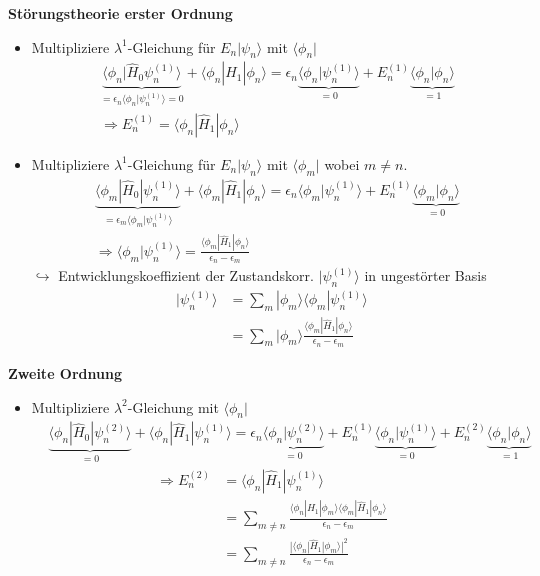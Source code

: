 \documentclass[10pt,article,colorback,accentcolor=tud9d]{scrartcl}
\begin{document}
\noindent\textbf{Störungstheorie erster Ordnung}
\begin{itemize}
	\item Multipliziere $\lambda^1$-Gleichung für $E_n|\psi_n\rangle$ mit $\langle\phi_n|$
    \begin{align}
    &\underbrace{\langle\phi_n|\hat{H}_0\psi_n^{(1)}\rangle}_{=\epsilon_n\langle\phi_n|\psi_n^{(1)}\rangle=0}+\langle\phi_n|\hat{H}_1|\phi_n\rangle=\epsilon_n\underbrace{\langle\phi_n|\psi_n^{(1)}\rangle}_{=0}+E_n^{(1)}\underbrace{\langle\phi_n|\phi_n\rangle}_{=1}\\
    &\Rightarrow E_n^{(1)}=\langle\phi_n|\hat{H}_1|\phi_n\rangle
    \end{align}
  \item Multipliziere $\lambda^1$-Gleichung für $E_n|\psi_n\rangle$ mit $\langle\phi_m|$ wobei $m\neq n$.
    \begin{align}
    &\underbrace{\langle\phi_m|\hat{H}_0|\psi_n^{(1)}\rangle}_{=\epsilon_m\langle\phi_m|\psi_n^{(1)}\rangle}+\langle\phi_m|\hat{H}_1|\phi_n\rangle=\epsilon_n\langle\phi_m|\psi_n^{(1)}\rangle+E_n^{(1)}\underbrace{\langle\phi_m|\phi_n\rangle}_{=0}\\
    &\Rightarrow \langle\phi_m|\psi_n^{(1)}\rangle=\frac{\langle\phi_m|\hat{H}_1|\phi_n\rangle}{\epsilon_n-\epsilon_m}
    \end{align}
    $\hookrightarrow$ Entwicklungskoeffizient der Zustandskorr. $|\psi_n^{(1)}\rangle$ in ungestörter Basis
    \begin{align}
    |\psi_n^{(1)}\rangle&=\sum_m|\phi_m\rangle\langle\phi_m|\psi_n^{(1)}\rangle\\
    &=\sum_m|\phi_m\rangle\frac{\langle\phi_m|\hat{H}_1|\phi_n\rangle}{\epsilon_n-\epsilon_m}
    \end{align}
\end{itemize}

\noindent\textbf{Zweite Ordnung}
\begin{itemize}
	\item Multipliziere $\lambda^2$-Gleichung mit $\langle\phi_n|$ 
    \begin{align}
    &\underbrace{\langle\phi_n|\hat{H}_0|\psi_n^{(2)}\rangle}_{=0}+\langle\phi_n|\hat{H}_1|\psi_n^{(1)}\rangle=\epsilon_n\underbrace{\langle\phi_n|\psi_n^{(2)}\rangle}_{=0}+E_n^{(1)}\underbrace{\langle\phi_n|\psi_n^{(1)}\rangle}_{=0}+E_n^{(2)}\underbrace{\langle\phi_n|\phi_n\rangle}_{=1}
    \end{align}
    \begin{align}
    \Rightarrow E_n^{(2)}&=\langle\phi_n|\hat{H}_1|\psi_n^{(1)}\rangle\\
    &=\sum_{m\neq n}\frac{\langle\phi_n|\hat{H}_1|\phi_m\rangle\langle\phi_m|\hat{H}_1|\phi_n\rangle}{\epsilon_n-\epsilon_m}\\
    &=\sum_{m\neq n}\frac{|\langle\phi_n|\hat{H}_1|\phi_m\rangle|^2}{\epsilon_n-\epsilon_m}
    \end{align}
\end{itemize}
\end{document}
